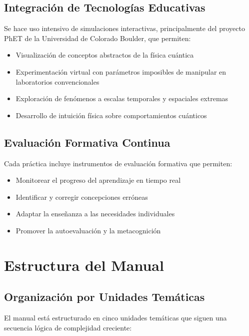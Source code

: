 \documentclass[12pt,a4paper]{book}
\begin{document}
	\subsection{Integración de Tecnologías Educativas}
	
	Se hace uso intensivo de simulaciones interactivas, principalmente del proyecto PhET de la Universidad de Colorado Boulder, que permiten:
	
	\begin{itemize}
		\item Visualización de conceptos abstractos de la física cuántica
		\item Experimentación virtual con parámetros imposibles de manipular en laboratorios convencionales
		\item Exploración de fenómenos a escalas temporales y espaciales extremas
		\item Desarrollo de intuición física sobre comportamientos cuánticos
	\end{itemize}
	
	\subsection{Evaluación Formativa Continua}
	
	Cada práctica incluye instrumentos de evaluación formativa que permiten:
	
	\begin{itemize}
		\item Monitorear el progreso del aprendizaje en tiempo real
		\item Identificar y corregir concepciones erróneas
		\item Adaptar la enseñanza a las necesidades individuales
		\item Promover la autoevaluación y la metacognición
	\end{itemize}
	
	\section{Estructura del Manual}
	
	\subsection{Organización por Unidades Temáticas}
	
	El manual está estructurado en cinco unidades temáticas que siguen una secuencia lógica de complejidad creciente:
	
\end{document}
